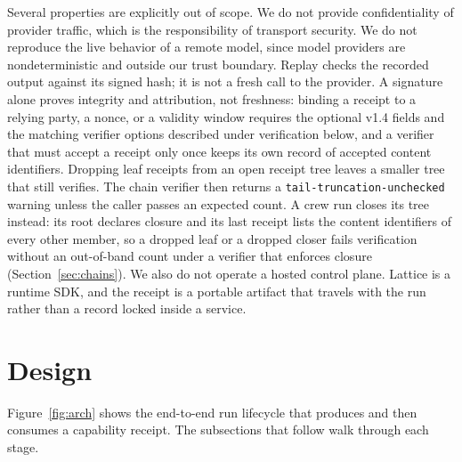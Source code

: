 \documentclass[conference]{IEEEtran}
\newcommand{\code}[1]{\texttt{\small #1}}
\begin{document}
Several properties are explicitly out of scope. We do not provide confidentiality of
provider traffic, which is the responsibility of transport security. We do not
reproduce the live behavior of a remote model, since model providers are
nondeterministic and outside our trust boundary. Replay checks the recorded output
against its signed hash; it is not a fresh call to the provider. A signature alone proves
integrity and attribution, not freshness: binding a receipt to a relying party, a
nonce, or a validity window requires the optional v1.4 fields and the matching
verifier options described under verification below, and a verifier that must
accept a receipt only once keeps its own record of accepted content identifiers.
Dropping leaf receipts from an open receipt tree leaves a smaller tree that still
verifies. The chain verifier then returns a \code{tail-truncation-unchecked} warning
unless the caller passes an expected count. A crew run closes its tree instead: its root
declares closure and its last receipt lists the content identifiers of every other
member, so a dropped leaf or a dropped closer fails verification without an out-of-band
count under a verifier that enforces closure (Section~\ref{sec:chains}). We also
do not operate a hosted control plane. Lattice is a runtime SDK, and the receipt is a
portable artifact that travels with the run rather than a record locked inside a
service.

\section{Design}

Figure~\ref{fig:arch} shows the end-to-end run lifecycle that produces and then
consumes a capability receipt. The subsections that follow walk through each stage.
\end{document}
